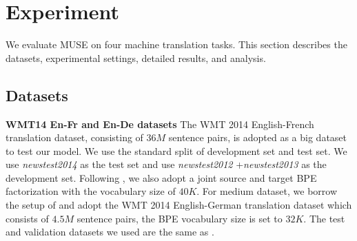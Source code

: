 \documentclass{article} %
\begin{document}




\section{Experiment}
We evaluate MUSE on four machine translation tasks. This section describes the datasets, experimental settings, detailed results, and analysis. %
\subsection{Datasets}
\textbf{WMT14 En-Fr and En-De datasets} The WMT 2014 English-French translation dataset, consisting of $36M$  sentence pairs, is adopted as a big dataset to test our model. We use the standard split of development set and test set. We use \textit{newstest2014} as the test set and use \textit{newstest2012} +\textit{newstest2013} as the development set. Following \citet{gehring2017convolutional}, we also adopt a joint source and target BPE factorization with the vocabulary size of $40K$.
For medium dataset, we borrow the setup of \citet{vaswani2017attention} and adopt the WMT 2014 English-German translation dataset which consists of $4.5M$ sentence pairs, the BPE vocabulary size is set to $32K$. The test and validation  datasets we used are the same as \citet{vaswani2017attention}.
\end{document}
